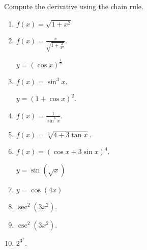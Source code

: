 Compute the derivative using the chain rule.
\begin{enumerate}[ref={\fcProblemRef}]
\item   $\displaystyle f(x)=\sqrt{1+x^2}$

\item\label{problemDifferentialtexDivsqrt(1+2divx^2)}  $\displaystyle  f(x)=\frac{x }{\sqrt{1+\frac{2}{x^2}}}$.

 \label{problemd/dx((cosx)^(1/2))} $y = (\cos x)^{\frac{1}{2}}$


\item $\displaystyle f(x)=\sin^3 x$.

 \label{problemd/dx((1+cosx)^2)}  $y = (1+\cos x)^2$.


\item   $\displaystyle f(x)=\frac{1}{\sin^3x}$.

\item  $\displaystyle f(x)= \sqrt[3]{4+3\tan x}$.

\item  $f(x)=(\cos x + 3\sin x)^4$.


 \label{problemd/dx(sin(sqrt(x)))}  $\displaystyle y = \sin \left( \sqrt{x}\right)$

\item  $y = \cos\left( 4x\right)$


\item $\sec^2 (3x^2)$. 


\item $\csc^2 (3x^2)$. 

\item $2^{3^x}$.


\end{enumerate}
